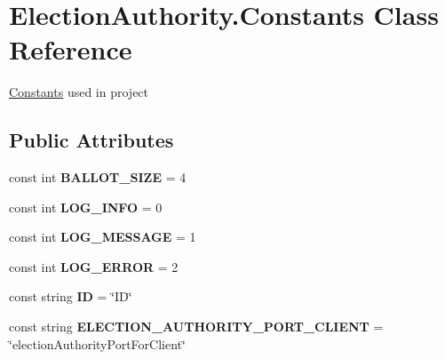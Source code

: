 \hypertarget{class_election_authority_1_1_constants}{}\section{Election\+Authority.\+Constants Class Reference}
\label{class_election_authority_1_1_constants}


\hyperlink{class_election_authority_1_1_constants}{Constants} used in project  


\subsection*{Public Attributes}
\begin{DoxyCompactItemize}
\item 
\hypertarget{class_election_authority_1_1_constants_a8307e0c5c711b7fb8e914d9ae29ddbb7}{}const int {\bfseries B\+A\+L\+L\+O\+T\+\_\+\+S\+I\+Z\+E} = 4\label{class_election_authority_1_1_constants_a8307e0c5c711b7fb8e914d9ae29ddbb7}

\item 
\hypertarget{class_election_authority_1_1_constants_a0f3935d2e5afe19da922aa9764417779}{}const int {\bfseries L\+O\+G\+\_\+\+I\+N\+F\+O} = 0\label{class_election_authority_1_1_constants_a0f3935d2e5afe19da922aa9764417779}

\item 
\hypertarget{class_election_authority_1_1_constants_a1b3b302c031ce27192fdfc4d1bcce966}{}const int {\bfseries L\+O\+G\+\_\+\+M\+E\+S\+S\+A\+G\+E} = 1\label{class_election_authority_1_1_constants_a1b3b302c031ce27192fdfc4d1bcce966}

\item 
\hypertarget{class_election_authority_1_1_constants_a7d9e61b980d9bcd50e952c432e47f9ac}{}const int {\bfseries L\+O\+G\+\_\+\+E\+R\+R\+O\+R} = 2\label{class_election_authority_1_1_constants_a7d9e61b980d9bcd50e952c432e47f9ac}

\item 
\hypertarget{class_election_authority_1_1_constants_a666a945fb4d7c65f5af4c757efc7769d}{}const string {\bfseries I\+D} = \char`\"{}I\+D\char`\"{}\label{class_election_authority_1_1_constants_a666a945fb4d7c65f5af4c757efc7769d}

\item 
\hypertarget{class_election_authority_1_1_constants_aae8fe339cbf18c3f751be660bd958e06}{}const string {\bfseries E\+L\+E\+C\+T\+I\+O\+N\+\_\+\+A\+U\+T\+H\+O\+R\+I\+T\+Y\+\_\+\+P\+O\+R\+T\+\_\+\+C\+L\+I\+E\+N\+T} = \char`\"{}election\+Authority\+Port\+For\+Client\char`\"{}\label{class_election_authority_1_1_constants_aae8fe339cbf18c3f751be660bd958e06}


\end{DoxyCompactItemize}

